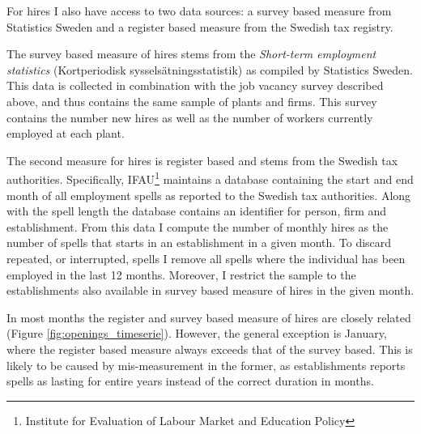 For hires I also have access to two data sources: a survey based measure from Statistics Sweden and a register based measure from the Swedish tax registry. 

The survey based measure of hires stems from the \emph{Short-term employment statistics} (Kortperiodisk sysselsätningsstatistik) as compiled by Statistics Sweden.
This data is collected in combination with the job vacancy survey described above, and thus contains the same sample of plants and firms. This survey contains the number new hires as well as the number of workers currently employed at each plant. %

The second measure for hires is register based and stems from the Swedish tax authorities. Specifically, IFAU\footnote{Institute for Evaluation of Labour Market and Education Policy} maintains a database containing the start and end month of all employment spells as reported to the Swedish tax authorities. Along with the spell length the database contains an identifier for person, firm and establishment. From this data I compute the number of monthly hires as the number of spells that starts in an establishment in a given month. To discard repeated, or interrupted, spells I remove all spells where the individual has been employed in the last 12 months. Moreover, I restrict the sample to the establishments also available in survey based measure of hires in the given month. %

In most months the register and survey based measure of hires are closely related (Figure \ref{fig:openings_timeserie}). However, the general exception is January, where the register based measure always exceeds that of the survey based. This is likely to be caused by mis-measurement in the former, as establishments reports spells as lasting for entire years instead of the correct duration in months. %



